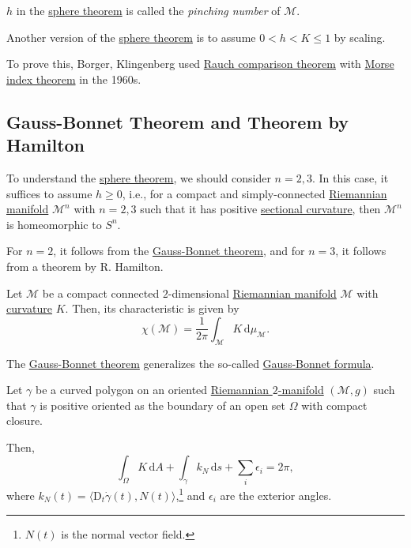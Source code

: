 \begin{notation}
	\(h\) in the \hyperref[thm:sphere]{sphere theorem} is called the \emph{pinching number} of \(\mathcal{M} \).
\end{notation}

\begin{remark}
	Another version of the \hyperref[thm:sphere]{sphere theorem} is to assume \(0 < h < K \leq 1\) by scaling.
\end{remark}

To prove this, Borger, Klingenberg used \hyperref[thm:Rauch-comparison]{Rauch comparison theorem}  with \hyperref[thm:Morse-index]{Morse index theorem} in the 1960s.

\subsection{Gauss-Bonnet Theorem and Theorem by Hamilton}
To understand the  \hyperref[thm:sphere]{sphere theorem}, we should consider \(n = 2, 3\). In this case, it suffices to assume \(h \geq 0\), i.e., for a compact and simply-connected \hyperref[def:Riemannian-manifold]{Riemannian manifold} \(\mathcal{M} ^n \) with \(n = 2, 3\) such that it has positive \hyperref[def:sectional-curvature]{sectional curvature}, then \(\mathcal{M} ^n\) is homeomorphic to \(S^n\).

\begin{note}
	For \(n = 2\), it follows from the \hyperref[thm:Gauss-Bonnet]{Gauss-Bonnet theorem}, and for \(n = 3\), it follows from a theorem by R. Hamilton.
\end{note}

\begin{theorem}\label{thm:Gauss-Bonnet}
	Let \(\mathcal{M} \) be a compact connected \(2\)-dimensional \hyperref[def:Riemannian-manifold]{Riemannian manifold} \(\mathcal{M} \) with \hyperref[rmk:Gauss-curvature]{curvature} \(K\). Then, its characteristic is given by
	\[
		\chi (\mathcal{M} ) = \frac{1}{2\pi } \int _\mathcal{M} K \,\mathrm{d} \mu _{\mathcal{M} }.
	\]
\end{theorem}

The \hyperref[thm:Gauss-Bonnet]{Gauss-Bonnet theorem} generalizes the so-called \hyperref[note:Gauss-Bonnet-formula]{Gauss-Bonnet formula}.

\begin{note}\label{note:Gauss-Bonnet-formula}
	Let \(\gamma \) be a curved polygon on an oriented \hyperref[def:Riemannian-manifold]{Riemannian \(2\)-manifold} \((\mathcal{M} , g)\) such that \(\gamma \) is positive oriented as the boundary of an open set \(\Omega \) with compact closure.

	Then,
	\[
		\int _\Omega K \,\mathrm{d} A + \int _{\gamma } k_N\,\mathrm{d} s + \sum_{i} \epsilon _i = 2\pi ,
	\]
	where \(k_N(t) = \langle \mathrm{D} _t \dot{\gamma }(t), N(t)  \rangle \),\footnote{\(N(t)\) is the normal vector field.} and \(\epsilon _i\) are the exterior angles.
\end{note}

